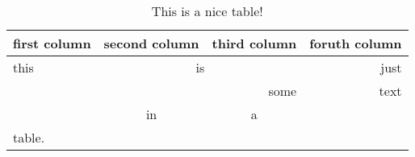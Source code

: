 \documentclass[a4paper, 11pt]{report}
\begin{document}
\begin{table}
    \begin{center}
        \begin{tabular}{|l|c|c|r|}
            \hline
            first column & second column & third column & foruth column \\
            \hline
            \hline
            this & \multicolumn{2}{|c|}{is} & just \\
            \hline
            \multicolumn{3}{|r|}{some} & text \\
            \cline{1-3}
            & in & a & \\
            \cline{3-4}
            \multicolumn{4}{|l|}{table.} \\
            \hline
        \end{tabular}
        \caption[Table]{This is a nice table!}
        \label{tab:bsp}
    \end{center}
\end{table}
\end{document}
